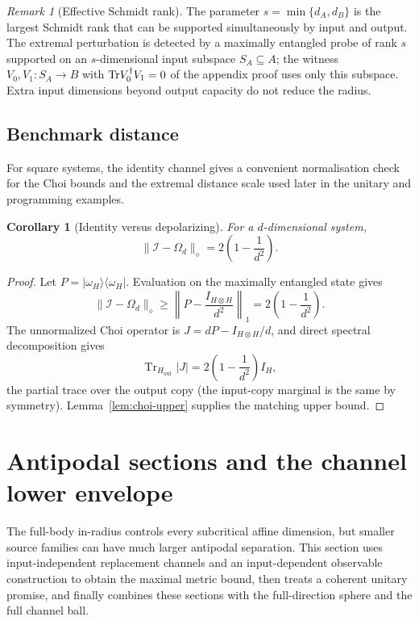 \documentclass[11pt,a4paper]{article}
\theoremstyle{definition}
\theoremstyle{plain}
\newtheorem{corollary}[theorem]{Corollary}
\theoremstyle{remark}
\newtheorem{remark}[theorem]{Remark}
\DeclareMathOperator{\Tr}{Tr}
\begin{document}
\begin{remark}[Effective Schmidt rank]
The parameter $s=\min\{d_A,d_B\}$ is the largest Schmidt rank that can be supported simultaneously by input and output. The extremal perturbation is detected by a maximally entangled probe of rank $s$ supported on an $s$-dimensional input subspace $S_A\subseteq A$; the witness $V_0,V_1:S_A\to B$ with ${\rm Tr}V_0^\dagger V_1=0$ of the appendix proof uses only this subspace. Extra input dimensions beyond output capacity do not reduce the radius.
\end{remark}

\subsection{Benchmark distance}

For square systems, the identity channel gives a convenient normalisation
check for the Choi bounds and the extremal distance scale used later in the
unitary and programming examples.

\begin{corollary}[Identity versus depolarizing]
\label{cor:id-dep}
For a $d$-dimensional system,
\[
\|\mathcal I-\Omega_d\|_\diamond
=2\left(1-\frac1{d^2}\right).
\]
\end{corollary}

\begin{proof}
Let $P=|\omega_H\rangle\langle\omega_H|$. Evaluation on the maximally
entangled state gives
\[
\|\mathcal I-\Omega_d\|_\diamond
\geq\left\|P-\frac{I_{H\otimes H}}{d^2}\right\|_1
=2\left(1-\frac1{d^2}\right).
\]
The unnormalized Choi operator is
$J=dP-I_{H\otimes H}/d$, and direct spectral decomposition gives
\[
\Tr_{H_{\mathrm{out}}}|J|=2\left(1-\frac1{d^2}\right)I_H,
\]
the partial trace over the output copy (the input-copy marginal is the same by symmetry).
Lemma~\ref{lem:choi-upper} supplies the matching upper bound.
\end{proof}

\section{Antipodal sections and the channel lower envelope}
\label{sec:replacement-unitary}

The full-body in-radius controls every subcritical affine dimension, but
smaller source families can have much larger antipodal separation. This
section uses input-independent replacement channels and an input-dependent
observable construction to obtain the maximal metric bound, then treats a
coherent unitary promise, and finally combines these sections with the
full-direction sphere and the full channel ball.
\end{document}
